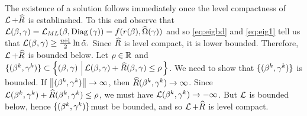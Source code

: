 The existence of a solution follows immediately once the level compactness
of $\LL + \hR$ is establinshed. To this end
observe that
$\LL(\beta,\gam)=\LL_{ML}(\beta, \Diag{\gamma})=f( r(\beta), \hOmega(\gamma))$ 
and so 
\eqref{eq:eigbd} and  \eqref{eq:eig1} tell us that
\(
\LL\bg\ge  \frac{n\!+\!1}{2}\ln\talf.
\)
Since $\hR$ is level compact, it is lower bounded.
Therefore, $\LL +\hR$ is bounded below.
Let $\rho\in\R$ and $\{\bgk\}
\subset
\lset{\bg}{\LL\bg +\hR\bg\le\rho}$. 
We need to show that
$\{\bgk\}$ is bounded.
If $\norm{\bgk}\rightarrow \infty$,
then $\hR\bgk\rightarrow \infty$. Since $\LL\bgk +\hR\bgk\le\rho$, we must
have $\LL\bgk\rightarrow -\infty$. But $\LL$ is bounded below, hence 
$\{\bgk\}$must be bounded, and so $\LL +\hR$ is level compact.
